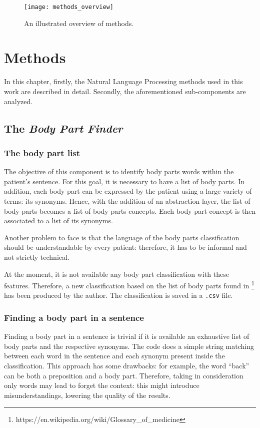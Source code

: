 \begin{figure}[h]
\centering
\texttt{[image: methods\_overview]}
\caption{An illustrated overview of methods.}
\medskip
\end{figure}

\newpage
\chapter{Methods}
\label{cha:methods}
In this chapter, firstly, the Natural Language Processing methods used in this work are described in detail. Secondly, the aforementioned sub-components are analyzed.

\section{The \textit{Body Part Finder}}
\label{sec:body_part_finder}
\subsection{The body part list}
The objective of this component is to identify body parts words within the patient's sentence. For this goal, it is necessary to have a list of body parts. In addition, each body part can be expressed by the patient using a large variety of terms: its synonyms. Hence, with the addition of an abstraction layer, the list of body parts becomes a list of body parts concepts. Each body part concept is then associated to a list of its synonyms. 

Another problem to face is that the language of the body parts classification should be understandable by every patient: therefore, it has to be informal and not strictly technical.

At the moment, it is not available any body part classification with these features. Therefore, a new classification based on the list of body parts found in \footnote{https://en.wikipedia.org/wiki/Glossary\_of\_medicine} \cite{bodypartswiki} has been produced by the author. The classification is saved in a \texttt{.csv} file.

\subsection{Finding a body part in a sentence}
Finding a body part in a sentence is trivial if it is available an exhaustive list of body parts and the respective synonyms. The code does a simple string matching between each word in the sentence and each synonym present inside the classification. This approach has some drawbacks: for example, the word “back” can be both a preposition and a body part. Therefore, taking in consideration only words may lead to forget the context: this might introduce misunderstandings, lowering the quality of the results.

